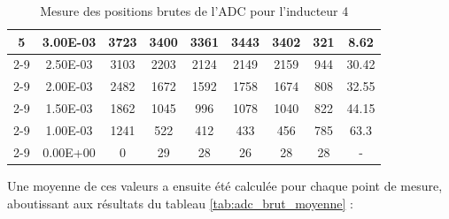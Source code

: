 \begin{table}[H]
{\begin{tabular}{|c|c|c|c|c|c|c|c|c|}
            \multirow{6}{*}{5} & 3.00E-03         & 3723      & 3400                                                       & 3361                                                      & 3443                                                      & 3402    & 321    & 8.62                                                               \\ \cline{2-9}
                               & 2.50E-03         & 3103      & 2203                                                       & 2124                                                      & 2149                                                      & 2159    & 944    & 30.42                                                              \\ \cline{2-9}
                               & 2.00E-03         & 2482      & 1672                                                       & 1592                                                      & 1758                                                      & 1674    & 808    & 32.55                                                              \\ \cline{2-9}
                               & 1.50E-03         & 1862      & 1045                                                       & 996                                                       & 1078                                                      & 1040    & 822    & 44.15                                                              \\ \cline{2-9}
                               & 1.00E-03         & 1241      & 522                                                        & 412                                                       & 433                                                       & 456     & 785    & 63.3                                                               \\ \cline{2-9}
                               & 0.00E+00         & 0         & 29                                                         & 28                                                        & 26                                                        & 28      & 28     & -                                                                  \\ \hline
        \end{tabular}%
    }
    \caption{Mesure des positions brutes de l'ADC pour l'inducteur 4}
    \label{tab:adc_brut_inducteur4}
\end{table}

Une moyenne de ces valeurs a ensuite été calculée pour chaque point de mesure, aboutissant aux résultats du tableau \ref{tab:adc_brut_moyenne} :

